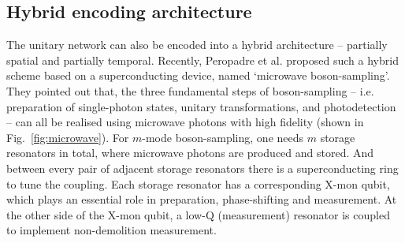 \documentclass[aps,rmp,twocolumn,amsmath,amssymb,nofootinbib,superscriptaddress]{revtex4}
\begin{document}
\subsection{Hybrid encoding architecture}

The unitary network can also be encoded into a hybrid architecture -- partially spatial and partially temporal. Recently, Peropadre et al. \cite{bib:20} proposed such a hybrid scheme based on a superconducting device, named `microwave boson-sampling'. They pointed out that, the three fundamental steps of boson-sampling -- i.e. preparation of single-photon states, unitary transformations, and photodetection -- can all be realised using microwave photons with high fidelity (shown in Fig.~\ref{fig:microwave}). For $m$-mode boson-sampling, one needs $m$ storage resonators in total, where microwave photons are produced and stored. And between every pair of adjacent storage resonators there is a superconducting ring to tune the coupling. Each storage resonator has a corresponding X-mon qubit, which plays an essential role in preparation, phase-shifting and measurement. At the other side of the X-mon qubit, a low-Q (measurement) resonator is coupled to implement non-demolition measurement.
\end{document}
